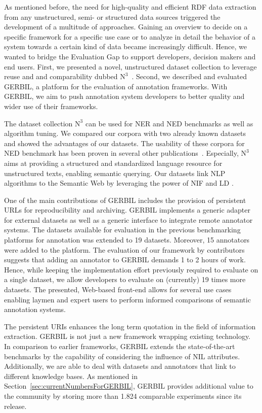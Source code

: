 As mentioned before, the need for high-quality and efficient RDF data extraction from any unstructured, semi- or structured data sources triggered the development of a multitude of approaches. 
Gaining an overview to decide on a specific framework for a specific use case or to analyze in detail the behavior of  a system towards a certain kind of data became increasingly difficult.
Hence, we wanted to bridge the Evaluation Gap to  support developers, decision makers and end users.
First, we presented a novel, unstructured dataset collection to leverage reuse and and comparability dubbed $\mbox{N}^3$~\cite{n3}. 
Second, we described and evaluated GERBIL, a platform for the evaluation of annotation frameworks. With GERBIL, we aim to push annotation system developers to better quality and wider use of their frameworks.

The dataset collection $\mbox{N}^3$ can be used for \ac{NER}  and \ac{NED}  benchmarks as well as algorithm tuning.
We compared our corpora with two already known datasets and showed the advantages of our datasets.
The usability of these corpora for \ac{NED}  benchmark has been proven in several other publications~\cite{agdistis_iswc,GER+13,GERBIL}.
Especially, $\mbox{N}^3$ aims at providing a structured and standardized language resource for unstructured texts, enabling semantic querying.
Our datasets link \ac{NLP}  algorithms to the Semantic Web by leveraging the power of NIF and \ac{LD} .

One of the main contributions of GERBIL includes the provision of persistent URLs for reproducibility and archiving.
GERBIL implements a generic adapter for external datasets as well as a generic interface to integrate remote annotator systems.
The datasets available for evaluation in the previous benchmarking platforms for annotation was extended to 19 datasets. 
Moreover, 15 annotators were added to the platform. 
The evaluation of our framework by contributors suggests that adding an annotator to GERBIL demands 1 to 2 hours of work. 
Hence, while keeping the implementation effort previously required to evaluate on a single dataset, we allow developers to evaluate on (currently) 19 times more datasets.
The presented, Web-based front-end allows for several use cases enabling laymen and expert users to perform informed  comparisons of semantic annotation systems.

The persistent URIs enhances the long term quotation in the field of information extraction.
GERBIL is not just a new framework wrapping existing technology. 
In comparison to earlier frameworks, GERBIL extends the state-of-the-art benchmarks by the capability of considering the influence of NIL attributes.
Additionally, we are able to deal with datasets and annotators that link to different knowledge bases.
As mentioned in Section~\ref{sec:currentNumbersForGERBIL}, GERBIL provides additional value to the community by storing more than 1.824 comparable experiments since its release. 

